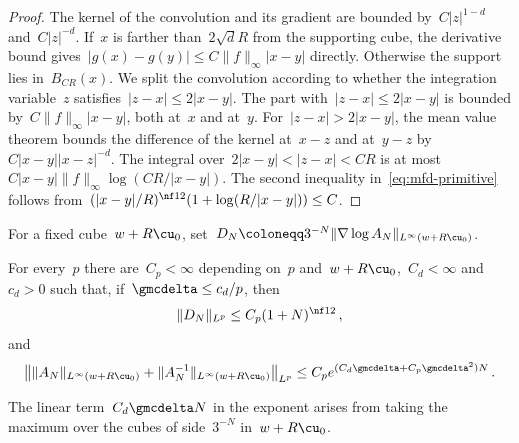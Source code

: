 \documentclass[11pt]{amsart}
\begin{document}
\begin{proof}
The kernel of the convolution and its gradient are bounded by~$C|z|^{1-d}$ and~$C|z|^{-d}$. If~$x$ is farther than~$2\sqrt dR$ from the supporting cube, the derivative bound gives~$|g(x)-g(y)|\leq C\|f\|_\infty|x-y|$ directly. Otherwise the support lies in~$B_{CR}(x)$. We split the convolution according to whether the integration variable~$z$ satisfies~$|z-x|\leq2|x-y|$. The part with~$|z-x|\leq2|x-y|$ is bounded by~$C\|f\|_\infty|x-y|$, both at~$x$ and at~$y$. For~$|z-x|>2|x-y|$, the mean value theorem bounds the difference of the kernel at~$x-z$ and at~$y-z$ by~$C|x-y||x-z|^{-d}$. The integral over~$2|x-y|<|z-x|<CR$ is at most~$C|x-y|\|f\|_\infty\log(CR/|x-y|)$. The second inequality in~\eqref{eq:mfd-primitive} follows from~$(|x-y|/R)^{\nf12}(1+\log(R/|x-y|))\leq C$.
\end{proof}

For a fixed cube~$w+R\cu_0$, set~$D_N\coloneqq3^{-N}\|\nabla\log A_N\|_{L^\infty(w+R\cu_0)}$.

\begin{lemma}
\label{mfd:lem-extremes}
For every~$p$ there are~$C_p<\infty$ depending on~$p$ and~$w+R\cu_0$,~$C_d<\infty$ and~$c_d>0$ such that, if~$\gmcdelta\leq c_d/p$, then
\begin{equation*}
	\|D_N\|_{L^p}\leq C_p(1+N)^{\nf12}\,,
\end{equation*}
and
\begin{equation}
	\bigl\|\|A_N\|_{L^\infty(w+R\cu_0)}+\|A_N^{-1}\|_{L^\infty(w+R\cu_0)}\bigr\|_{L^p}
	\leq C_pe^{(C_d\gmcdelta+C_p\gmcdelta^2)N}\,.
	\label{eq:mfd-6}
\end{equation}
\end{lemma}

The linear term~$C_d\gmcdelta N$ in the exponent arises from taking the maximum over the cubes of side~$3^{-N}$ in~$w+R\cu_0$.
\end{document}
